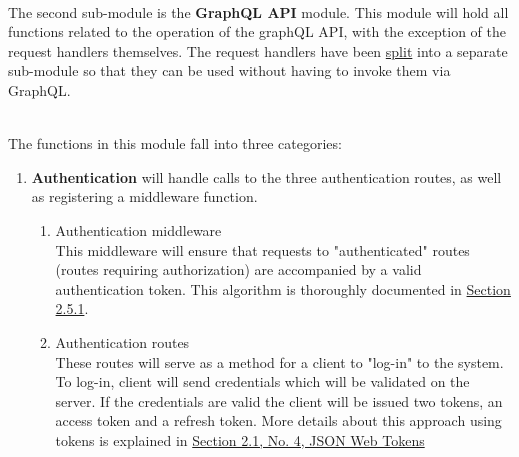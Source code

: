 \documentclass[../../main.tex]{subfiles}
\begin{document}
\noindent \\ The second sub-module is the \textbf{GraphQL API} module.
This module will hold all functions related to the operation of the
graphQL API, with the exception of the request handlers themselves.
The request handlers have been \underline{split} into a separate
sub-module so that they can be used without having to invoke them
via GraphQL.

\noindent \\ The functions in this module fall into three categories:

\begin{enumerate}
    \item \textbf{Authentication} will handle calls to the three
          authentication routes, as well as registering a middleware function.
          \begin{enumerate}
              \item Authentication middleware\\
                    This middleware will ensure that requests to "authenticated"
                    routes (routes requiring authorization) are accompanied by a
                    valid authentication token. This algorithm is thoroughly
                    documented in \underline{Section 2.5.1}.

              \item Authentication routes\\
                    These routes will serve as a method for a client
                    to "log-in" to the system. To log-in, client will send
                    credentials which will be validated on the server. If
                    the credentials are valid the client will be issued
                    two tokens, an access token and a refresh token.
                    More details about this approach using tokens is explained
                    in \underline{Section 2.1, No. 4, JSON Web Tokens}
          \end{enumerate}


\end{enumerate}
\end{document}
